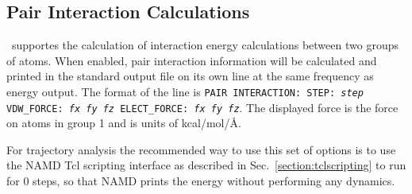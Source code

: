 \subsection{Pair Interaction Calculations}
\label{section:pairinteraction}
\NAMD\ supportes the calculation of interaction energy calculations between 
two groups of atoms.  When enabled, pair interaction information will be
calculated and printed in the standard output file on its own line at the
same frequency as energy output.  The format of the line is
{\tt PAIR INTERACTION: STEP: {\it step} VDW\_FORCE: {\it fx fy fz} 
ELECT\_FORCE: {\it fx fy fz}}.
The displayed force is the force on atoms in group 1 and is units of 
kcal/mol/\AA. 

For trajectory analysis the 
recommended way to use this set of options is to use the NAMD Tcl scripting 
interface as described in Sec.~\ref{section:tclscripting} to run for
0 steps, so that NAMD prints the energy without performing any dynamics.

